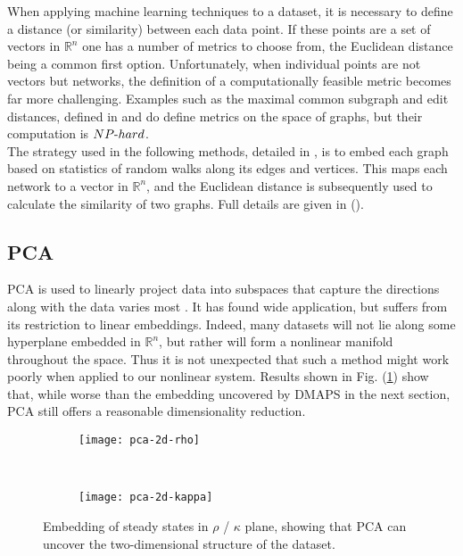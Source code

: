 \documentclass[epjST, final]{svjour}
\begin{document}
\begin{onehalfspace}
When applying machine learning techniques to a dataset, it is necessary to define a distance (or similarity) between each data point. If these points are a set of vectors in $\mathbb{R}^n$ one has a number of metrics to choose from, the Euclidean distance being a common first option. Unfortunately, when individual points are not vectors but networks, the definition of a computationally feasible metric becomes far more challenging. Examples such as the maximal common subgraph and edit distances, defined in \cite{bunke_graph_1998} and \cite{gao_survey_2010} do define metrics on the space of graphs, but their computation is $NP\textnormal{-}hard$. \\

The strategy used in the following methods, detailed in \cite{rajendran_analysis_2013}, is to embed each graph based on statistics of random walks along its edges and vertices. This maps each network to a vector in $\mathbb{R}^n$, and the Euclidean distance is subsequently used to calculate the similarity of two graphs. Full details are given in (\cite{rajendran_analysis_2013}).

\subsection{PCA}


PCA is used to linearly project data into subspaces that capture the
directions along with the data varies most
\cite{jolliffe_principal_2014}. It has found wide application, but
suffers from its restriction to linear embeddings. Indeed, many
datasets will not lie along some hyperplane embedded in
$\mathbb{R}^n$, but rather will form a nonlinear manifold throughout
the space. Thus it is not unexpected that such a method might work
poorly when applied to our nonlinear system. Results shown in
Fig. (\ref{fig:pca}) show that, while worse than the embedding
uncovered by DMAPS in the next section, PCA still offers a reasonable
dimensionality reduction.

\begin{figure}[h!]
  \vspace{-5mm}
  \centering
  \begin{subfigure}{0.75\textwidth}
    \centering
    \texttt{[image: pca-2d-rho]}
  \end{subfigure} \\ %
  \begin{subfigure}{0.75\textwidth}
    \centering
    \texttt{[image: pca-2d-kappa]}
  \end{subfigure}%
  \caption{Embedding of steady states in $\rho$ / $\kappa$ plane,
    showing that PCA can uncover the two-dimensional structure of the
    dataset. \label{fig:pca}}
\end{figure}


\end{onehalfspace}
\end{document}
